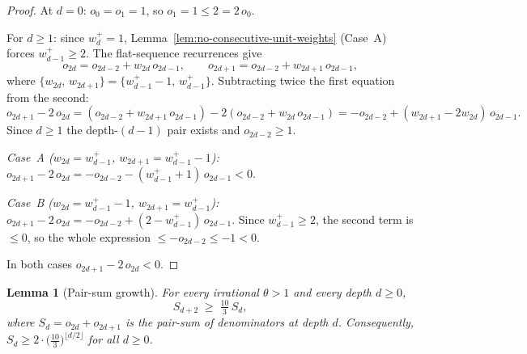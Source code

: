 \documentclass[12pt]{article}
\newtheorem{lemma}[theorem]{Lemma}
\theoremstyle{definition}
\theoremstyle{remark}
\theoremstyle{plain}
\begin{document}
\begin{proof}
At $d = 0$: $o_0 = o_1 = 1$, so $o_1 = 1 \leq 2 = 2\,o_0$.

For $d \geq 1$: since $w^+_d = 1$,
Lemma~\ref{lem:no-consecutive-unit-weights} (Case~A) forces $w^+_{d-1} \geq 2$.
The flat-sequence recurrences give
\[
  o_{2d} = o_{2d-2} + w_{2d}\,o_{2d-1}, \qquad
  o_{2d+1} = o_{2d-2} + w_{2d+1}\,o_{2d-1},
\]
where $\{w_{2d},\, w_{2d+1}\} = \{w^+_{d-1}-1,\, w^+_{d-1}\}$.  Subtracting twice the first
equation from the second:
\[
  o_{2d+1} - 2\,o_{2d}
  = (o_{2d-2} + w_{2d+1}\,o_{2d-1}) - 2(o_{2d-2} + w_{2d}\,o_{2d-1})
  = -o_{2d-2} + (w_{2d+1} - 2w_{2d})\,o_{2d-1}.
\]
Since $d \geq 1$ the depth-$(d-1)$ pair exists and $o_{2d-2} \geq 1$.

\textit{Case~A ($w_{2d} = w^+_{d-1}$, $w_{2d+1} = w^+_{d-1}-1$):}
$o_{2d+1} - 2\,o_{2d} = -o_{2d-2} - (w^+_{d-1}+1)\,o_{2d-1} < 0$.

\textit{Case~B ($w_{2d} = w^+_{d-1}-1$, $w_{2d+1} = w^+_{d-1}$):}
$o_{2d+1} - 2\,o_{2d} = -o_{2d-2} + (2 - w^+_{d-1})\,o_{2d-1}$.
Since $w^+_{d-1} \geq 2$, the second term is $\leq 0$, so the whole expression
$\leq -o_{2d-2} \leq -1 < 0$.

In both cases $o_{2d+1} - 2\,o_{2d} < 0$.
\end{proof}

\begin{lemma}[Pair-sum growth]
\label{lem:pair-sum-growth}
For every irrational $\theta > 1$ and every depth $d \geq 0$,
\[
  S_{d+2} \;\geq\; \tfrac{10}{3}\,S_d,
\]
where $S_d = o_{2d} + o_{2d+1}$ is the pair-sum of denominators at depth $d$.
Consequently, $S_d \geq 2\cdot\bigl(\tfrac{10}{3}\bigr)^{\lfloor d/2\rfloor}$ for all $d \geq 0$.
\end{lemma}
\end{document}
